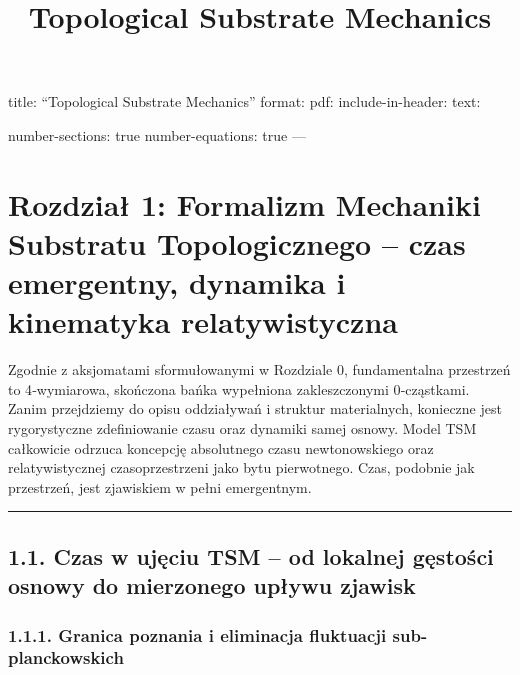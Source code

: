 \documentclass[
  letterpaper,
  DIV=11,
  numbers=noendperiod]{scrartcl}
\title{Topological Substrate Mechanics}
\author{}
\date{}
\numberwithin{equation}{subsection}
\begin{document}
\maketitle


\subsection{}\label{section}

title: ``Topological Substrate Mechanics'' format: pdf:
include-in-header: text: \textbar{}

\usepackage{amsmath}

number-sections: true number-equations: true ---

\section{Rozdział 1: Formalizm Mechaniki Substratu Topologicznego --
czas emergentny, dynamika i kinematyka
relatywistyczna}\label{rozdziaux142-1-formalizm-mechaniki-substratu-topologicznego-czas-emergentny-dynamika-i-kinematyka-relatywistyczna}

Zgodnie z aksjomatami sformułowanymi w Rozdziale 0, fundamentalna
przestrzeń to 4‑wymiarowa, skończona bańka wypełniona zakleszczonymi
0‑cząstkami. Zanim przejdziemy do opisu oddziaływań i struktur
materialnych, konieczne jest rygorystyczne zdefiniowanie czasu oraz
dynamiki samej osnowy. Model TSM całkowicie odrzuca koncepcję
absolutnego czasu newtonowskiego oraz relatywistycznej czasoprzestrzeni
jako bytu pierwotnego. Czas, podobnie jak przestrzeń, jest zjawiskiem w
pełni emergentnym.

\begin{center}\rule{0.5\linewidth}{0.5pt}\end{center}

\subsection{1.1. Czas w ujęciu TSM -- od lokalnej gęstości osnowy do
mierzonego upływu
zjawisk}\label{czas-w-ujux119ciu-tsm-od-lokalnej-gux119stoux15bci-osnowy-do-mierzonego-upux142ywu-zjawisk}

\subsubsection{1.1.1. Granica poznania i eliminacja fluktuacji
sub-planckowskich}\label{granica-poznania-i-eliminacja-fluktuacji-sub-planckowskich}
\end{document}
